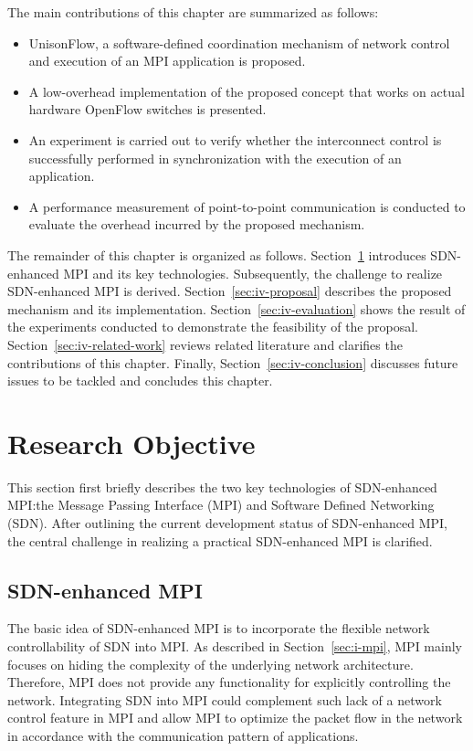 The main contributions of this chapter are summarized as follows:

\begin{itemize}
\item
  UnisonFlow, a software-defined coordination mechanism of network
  control and execution of an MPI application is proposed.
\item
  A low-overhead implementation of the proposed concept that works on
  actual hardware OpenFlow switches is presented.
\item
  An experiment is carried out to verify whether the interconnect
  control is successfully performed in synchronization with the
  execution of an application.
\item
  A performance measurement of point-to-point communication is conducted
  to evaluate the overhead incurred by the proposed mechanism.
\end{itemize}

The remainder of this chapter is organized as follows.
Section~\ref{sec:iv-objective} introduces SDN-enhanced MPI and its key
technologies. Subsequently, the challenge to realize SDN-enhanced MPI is
derived. Section~\ref{sec:iv-proposal} describes the proposed mechanism and
its implementation. Section~\ref{sec:iv-evaluation} shows the result of the
experiments conducted to demonstrate the feasibility of the proposal.
Section~\ref{sec:iv-related-work} reviews related literature and clarifies the
contributions of this chapter. Finally, Section~\ref{sec:iv-conclusion}
discusses future issues to be tackled and concludes this chapter.

\section{Research Objective}\label{sec:iv-objective}

This section first briefly describes the two key technologies of
SDN-enhanced MPI:\@ the Message Passing Interface (MPI) and Software
Defined Networking (SDN). After outlining the current development status
of SDN-enhanced MPI, the central challenge in realizing a practical
SDN-enhanced MPI is clarified.

\subsection{SDN-enhanced MPI}\label{sec:iv-sdn-mpi}

The basic idea of SDN-enhanced MPI is to incorporate the flexible
network controllability of SDN into MPI\@. As described in
Section~\ref{sec:i-mpi}, MPI mainly focuses on hiding the
complexity of the underlying network architecture. Therefore, MPI does not
provide any functionality for explicitly controlling the network. Integrating
SDN into MPI could complement such lack of a network control feature in MPI
and allow MPI to optimize the packet flow in the network in accordance with
the communication pattern of applications.

